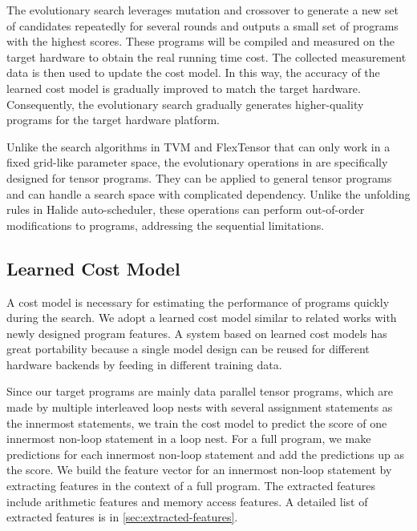 The evolutionary search leverages mutation and crossover to generate a new set of candidates repeatedly for several rounds and outputs a small set of programs with the highest scores.
These programs will be compiled and measured on the target hardware to obtain the real running time cost.
The collected measurement data is then used to update the cost model.
In this way, the accuracy of the learned cost model is gradually improved to match the target hardware.
Consequently, the evolutionary search gradually generates higher-quality programs for the target hardware platform.

Unlike the search algorithms in TVM and FlexTensor that can only work in a fixed grid-like parameter space, the evolutionary operations in \Ansor are specifically designed for tensor programs. They can be applied to general tensor programs and can handle a search space with complicated dependency.
Unlike the unfolding rules in Halide auto-scheduler, these operations can perform out-of-order modifications to programs, addressing the sequential limitations.

\subsection{Learned Cost Model}
\label{subsec:learned-cost-model}

A cost model is necessary for estimating the performance of programs quickly during the search. We adopt a learned cost model similar to related works \cite{adams2019learning, chen2018learning} with newly designed program features.
A system based on learned cost models has great portability because a single model design can be reused for different hardware backends by feeding in different training data.

Since our target programs are mainly data parallel tensor programs, which are made by multiple interleaved loop nests with several assignment statements as the innermost statements, we train the cost model to predict the score of one innermost non-loop statement in a loop nest.
For a full program, we make predictions for each innermost non-loop statement and add the predictions up as the score. We build the feature vector for an innermost non-loop statement by extracting features in the context of a full program. The extracted features include arithmetic features and memory access features.
A detailed list of extracted features is in \autoref{sec:extracted-features}.

